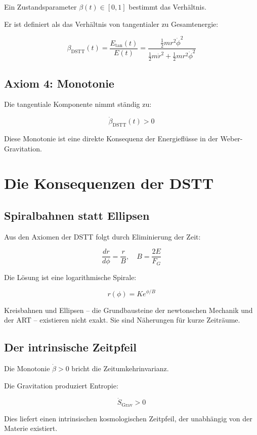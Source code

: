 Ein Zustandsparameter \( \beta(t) \in [0,1] \) bestimmt das Verhältnis.

Er ist definiert als das Verhältnis von tangentialer zu Gesamtenergie:

\[
\beta_{\text{DSTT}}(t) = \frac{E_{\text{tan}}(t)}{E(t)}
= \frac{\frac{1}{2} m r^2 \dot{\phi}^2}{\frac{1}{2} m \dot{r}^2 + \frac{1}{2} m r^2 \dot{\phi}^2}
\]

\subsection{Axiom 4: Monotonie}

Die tangentiale Komponente nimmt ständig zu:

\[
\dot{\beta}_{\text{DSTT}}(t) > 0
\]

Diese Monotonie ist eine direkte Konsequenz der Energieflüsse in der Weber-Gravitation.

\section{Die Konsequenzen der DSTT}

\subsection{Spiralbahnen statt Ellipsen}

Aus den Axiomen der DSTT folgt durch Eliminierung der Zeit:

\[
\frac{dr}{d\phi} = \frac{r}{B}, \quad B = \frac{2E}{F_G}
\]

Die Lösung ist eine logarithmische Spirale:

\[
r(\phi) = K e^{\phi/B}
\]

Kreisbahnen und Ellipsen – die Grundbausteine der newtonschen Mechanik und der ART – existieren nicht exakt. Sie sind Näherungen für kurze Zeiträume.

\subsection{Der intrinsische Zeitpfeil}

Die Monotonie \( \dot{\beta} > 0 \) bricht die Zeitumkehrinvarianz.

Die Gravitation produziert Entropie:

\[
\dot{S}_{\text{Grav}} > 0
\]

Dies liefert einen intrinsischen kosmologischen Zeitpfeil, der unabhängig von der Materie existiert.

